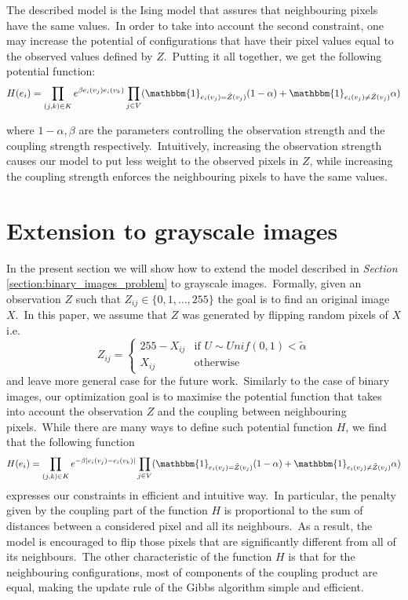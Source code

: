 \documentclass[a4paper, 11pt, onecolumn, openany, titlepage]{report}
\theoremstyle{default_theorem_style}\newtheorem{theorem}{Theorem}
\theoremstyle{default_theorem_style}\newtheorem{definition}{Definition}
\begin{document}
The described model is the Ising model that assures that neighbouring pixels have the same values.\ In order to
take into account the second constraint, one may increase the potential of configurations that have their pixel values
equal to the observed values defined by $Z$.\ Putting it all together, we get the following potential function:
$$
H(e_i) = \prod\limits_{(j, k) \in K} e^{\beta e_i(v_j)e_i(v_k)}
\prod\limits_{j \in V}(\mathbbm{1}_{e_i(v_j) = \tilde{Z}(v_j)}(1 - \alpha) +
\mathbbm{1}_{e_i(v_j) \neq \tilde{Z}(v_j)}\alpha)
$$

where $1 - \alpha, \beta$ are the parameters controlling the observation strength and the coupling strength
respectively.\ Intuitively, increasing the observation strength causes our model to put less weight to the
observed pixels in $Z$, while increasing the coupling strength enforces the neighbouring pixels to have the
same values.

\section{Extension to grayscale images}

In the present section we will show how to extend the model described in \textit{Section}
\ref{section:binary_images_problem} to grayscale images.\ Formally, given an observation $Z$ such
that $Z_{ij} \in \{0, 1, \dots, 255\}$ the goal is to find an original image $X$.\ In this paper, we assume
that $Z$ was generated by flipping random pixels of $X$ i.e.
$$
Z_{ij} =
\begin{cases}
  255 - X_{ij} &\text{if $U \sim Unif(0, 1) < \tilde{\alpha}$}\\
  X_{ij} &\text{otherwise}
\end{cases}
$$
and leave more general case for the future work.\ Similarly to the case of binary images, our optimization goal is to
maximise the potential function that takes into account the observation $Z$ and the coupling between neighbouring
pixels.\ While there are many ways to define such potential function $H$, we find that the following function
$$
H(e_i) = \prod\limits_{(j, k) \in K} e^{-\beta |e_i(v_j) - e_i(v_k)|}
\prod\limits_{j \in V}(\mathbbm{1}_{e_i(v_j) = \tilde{Z}(v_j)}(1 - \alpha) +
\mathbbm{1}_{e_i(v_j) \neq \tilde{Z}(v_j)}\alpha)
$$
expresses our constraints in efficient and intuitive way.\ In particular, the penalty given by the coupling part of
the function $H$ is proportional to the sum of distances between a considered pixel and all its neighbours.\ As a
result, the model is encouraged to flip those pixels that are significantly different from all of its
neighbours.\ The other characteristic of the function $H$ is that for the neighbouring configurations, most of
components of the coupling product are equal, making the update rule of the Gibbs algorithm simple and efficient.
\end{document}
